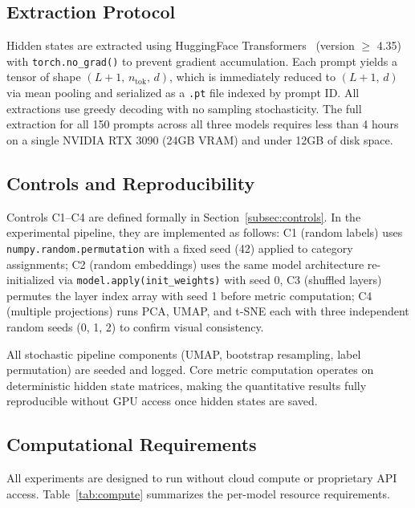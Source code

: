\documentclass{article}
\begin{document}
\subsection{Extraction Protocol}
\label{subsec:extraction_protocol}

Hidden states are extracted using HuggingFace Transformers~\cite{wolf2020transformers} (version $\geq$ 4.35) with \texttt{torch.no\_grad()} to prevent gradient accumulation. Each prompt yields a tensor of shape $(L+1,\, n_{\text{tok}},\, d)$, which is immediately reduced to $(L+1,\, d)$ via mean pooling and serialized as a \texttt{.pt} file indexed by prompt ID. All extractions use greedy decoding with no sampling stochasticity. The full extraction for all 150 prompts across all three models requires less than 4 hours on a single NVIDIA RTX 3090 (24GB VRAM) and under 12GB of disk space.

\subsection{Controls and Reproducibility}
\label{subsec:controls_setup}

Controls C1–C4 are defined formally in Section~\ref{subsec:controls}. In the experimental pipeline, they are implemented as follows: C1 (random labels) uses \texttt{numpy.random.permutation} with a fixed seed (42) applied to category assignments; C2 (random embeddings) uses the same model architecture re-initialized via \texttt{model.apply(init\_weights)} with seed 0, C3 (shuffled layers) permutes the layer index array with seed 1 before metric computation; C4 (multiple projections) runs PCA, UMAP, and t-SNE each with three independent random seeds (0, 1, 2) to confirm visual consistency.

All stochastic pipeline components (UMAP, bootstrap resampling, label permutation) are seeded and logged. Core metric computation operates on deterministic hidden state matrices, making the quantitative results fully reproducible without GPU access once hidden states are saved.

\subsection{Computational Requirements}
\label{subsec:compute}

All experiments are designed to run without cloud compute or proprietary API access. Table~\ref{tab:compute} summarizes the per-model resource requirements.
\end{document}
